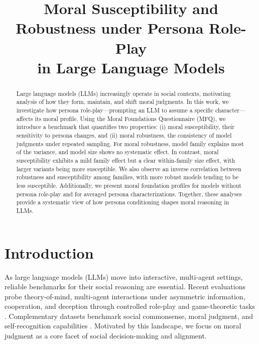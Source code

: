 \documentclass{article}
\title{Moral Susceptibility and Robustness under Persona Role-Play \\ in Large Language Models}
\author{}
\begin{document}
\maketitle

\begin{abstract}
  Large language models (LLMs) increasingly operate in social contexts, motivating analysis of how they form, maintain, and shift moral judgments. In this work, we investigate how persona role-play---prompting an LLM to assume a specific character---affects its moral profile. Using the Moral Foundations Questionnaire (MFQ), we introduce a benchmark that quantifies two properties: (i) moral susceptibility, their sensitivity to persona changes, and (ii) moral robustness, the consistency of model judgments under repeated sampling. For moral robustness, model family explains most of the variance, and model size shows no systematic effect. In contrast, moral susceptibility exhibits a mild family effect but a clear within-family size effect, with larger variants being more susceptible. We also observe an inverse correlation between robustness and susceptibility among families, with more robust models tending to be less susceptible. Additionally, we present moral foundation profiles for models without persona role-play and for averaged persona characterizations. Together, these analyses provide a systematic view of how persona conditioning shapes moral reasoning in LLMs.
\end{abstract}


\section{Introduction}
As large language models (LLMs) move into interactive, multi-agent settings, reliable benchmarks for their social reasoning are essential. Recent evaluations probe theory-of-mind, multi-agent interactions under asymmetric information, cooperation, and deception through controlled role-play and game-theoretic tasks \cite{zhou2024sotopia,pan2023machiavelli,bianchi2024negotiationarena,chen-etal-2024-tombench,costa2025deceivedetectdiscloselarge}. Complementary datasets benchmark social commonsense, moral judgment, and self-recognition capabilities \cite{sap-etal-2019-social,hendrycks2021ethics,bai2025knowthyselfincapabilityimplications}. Motivated by this landscape, we focus on moral judgment as a core facet of social decision-making and alignment.
\end{document}
